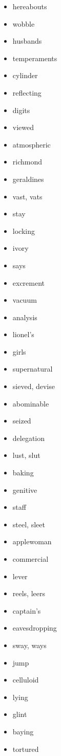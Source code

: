 \documentclass{article}
\begin{document}
\begin{itemize}
    \item hereabouts
    \item wobble
    \item husbands
    \item temperaments
    \item cylinder
    \item reflecting
    \item digits
    \item viewed
    \item atmospheric
    \item richmond
    \item geraldines
    \item vast, vats
    \item stay
    \item locking
    \item ivory
    \item says
    \item excrement
    \item vacuum
    \item analysis
    \item lionel's
    \item girls
    \item supernatural
    \item sieved, devise
    \item abominable
    \item seized
    \item delegation
    \item lust, slut
    \item baking
    \item genitive
    \item staff
    \item steel, sleet
    \item applewoman
    \item commercial
    \item lever
    \item reels, leers
    \item captain's
    \item eavesdropping
    \item sway, ways
    \item jump
    \item celluloid
    \item lying
    \item glint
    \item baying
    \item tortured

\end{itemize}
\end{document}
